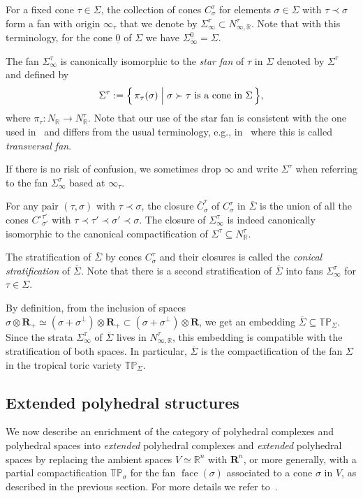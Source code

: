 \documentclass[11pt]{amsart}
\theoremstyle{definition}
\numberwithin{equation}{section}
\renewcommand{\~}{\widetilde}
\newcommand{\R}{\mathbb{R}}
\newcommand{\eR}{\mathbf R} %
\newcommand{\C}{{C^\circ}} %
\newcommand{\TP}{\mathbb{TP}} %
\newcommand{\st}{\bigm|} %
\newcommand{\Bigst}{\Bigm|} %
\newcommand{\comp}[1]{\overline{#1}} %
\newcommand{\conezero}{{\underline0}} %
\newcommand{\subface}{\prec}
\newcommand{\supface}{\succ}
\DeclareMathOperator{\faceop}{face}
\newcommand{\face}[1]{\faceop(#1)} %
\begin{document}
For a fixed cone $\tau \in \Sigma$, the collection of cones $C^\tau_\sigma$ for elements $\sigma \in \Sigma$ with $\tau \subface \sigma$ form a fan with origin $\infty_\tau$ that we denote by $\Sigma_\infty^\tau\subset{N^\tau_{\infty,\R}}$. Note that with this terminology, for the cone $\conezero$ of $\Sigma$ we have $\Sigma_\infty^\conezero = \Sigma$.

The fan $\Sigma_\infty^\tau$ is canonically isomorphic to the \emph{star fan} of $\tau$ in $\Sigma$ denoted by $\Sigma^\tau$ and defined by
\[\Sigma^\tau := \Bigl\{\, \pi_\tau (\sigma) \Bigst \sigma \supface \tau \textrm{ is a cone in $\Sigma$} \, \Bigr\}, \]
where $\pi_\tau\colon N_{\R} \to N^\tau_\R$. Note that our use of the star fan is consistent with the one used in~\cite{AHK} and differs from the usual terminology, e.g., in~\cites{Karu, BBFK} where this is called \emph{transversal fan}.

If there is no risk of confusion, we sometimes drop $\infty$ and write $\Sigma^\tau$ when referring to the fan $\Sigma_\infty^\tau$ based at $\infty_\tau$.

For any pair $(\tau, \sigma)$ with $\tau \subface \sigma$, the closure $\comp C^\tau_\sigma$ of $C^\tau_\sigma$ in $\comp \Sigma$ is the union of all the cones $\C^{\tau'}_{\sigma'}$ with $\tau \subface \tau' \subface \sigma' \subface \sigma$. The closure of $\Sigma_\infty^\tau$ is indeed canonically isomorphic to the canonical compactification of $\Sigma^\tau \subseteq N^{\tau}_\R$.

The stratification of $\comp \Sigma$ by cones $C^\tau_\sigma$ and their closures is called the \emph{conical stratification} of $\comp \Sigma$. Note that there is a second stratification of $\comp \Sigma$ into fans $\Sigma_\infty^\tau$ for $\tau \in \Sigma$.

\medskip

By definition, from the inclusion of spaces $\sigma\otimes\eR_+ \simeq (\sigma+\sigma^\perp)\otimes\eR_+ \subset (\sigma+\sigma^\perp)\otimes\eR$, we get an embedding $\comp \Sigma \subseteq \TP_\Sigma$. Since the strata $\Sigma^\tau_\infty$ of $\comp \Sigma$ lives in $N^\tau_{\infty, \R}$, this embedding is compatible with the stratification of both spaces. In particular, $\comp \Sigma$ is the compactification of the fan $\Sigma$ in the tropical toric variety $\TP_\Sigma$.



\subsection{Extended polyhedral structures}\label{sec:extpc} We now describe an enrichment of the category of polyhedral complexes and polyhedral spaces into \emph{extended} polyhedral complexes and \emph{extended} polyhedral spaces by replacing the ambient spaces $V\simeq \R^n$ with $\eR^n$, or more generally, with a partial compactification $\TP_\sigma$ for the fan $\face\sigma$ associated to a cone $\sigma$ in $V$, as described in the previous section. For more details we refer to~\cites{JSS, MZ, IKMZ}.
\end{document}
